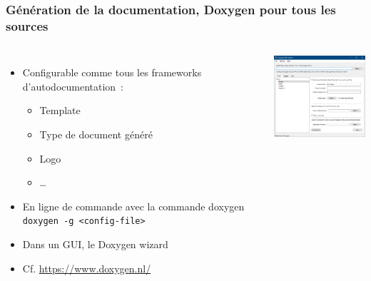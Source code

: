 \documentclass{beamer}
\begin{document}
    \begin{frame}
        \transdissolve
        \frametitle{Génération de la documentation, Doxygen pour tous les sources}
        \begin{columns}

            \begin{itemize}

                \item Configurable comme tous les frameworks d'autodocumentation~:

                \begin{itemize}
                    \item Template
                    \item Type de document généré
                    \item Logo
                    \item …
                \end{itemize}
                \item En ligne de commande avec la commande doxygen \lstinline{doxygen -g <config-file>}

                \item Dans un GUI, le Doxygen wizard
                \item Cf. \url{https://www.doxygen.nl/}

            \end{itemize}


            \centering
            \includegraphics[width=5cm]{image/doxygen-configuration-hmi.png}

        \end{columns}

    \end{frame}
\end{document}
